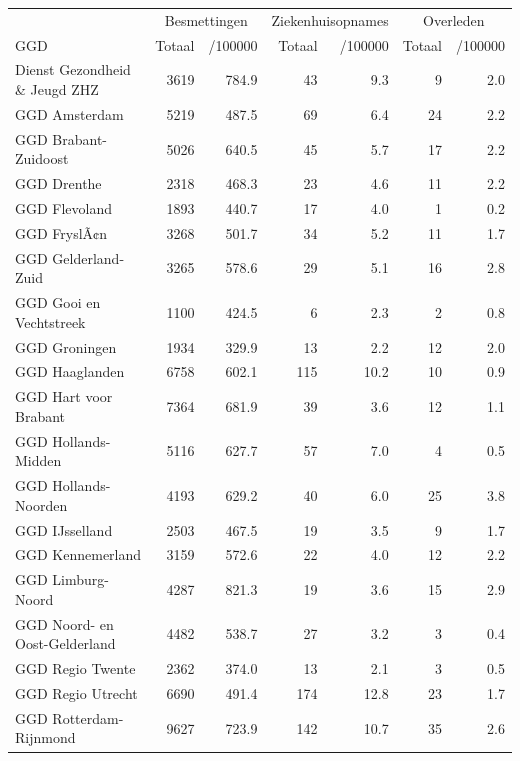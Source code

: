 \documentclass[
  english,
  man,floatsintext]{apa6}
\begin{document}
\begin{table}
\centering\begingroup\fontsize{10}{12}\selectfont

\begin{threeparttable}
\begin{tabular}{lrrrrrr}
\toprule
\multicolumn{1}{c}{ } & \multicolumn{2}{c}{Besmettingen} & \multicolumn{2}{c}{Ziekenhuisopnames} & \multicolumn{2}{c}{Overleden} \\
\cmidrule(l{3pt}r{3pt}){2-3} \cmidrule(l{3pt}r{3pt}){4-5} \cmidrule(l{3pt}r{3pt}){6-7}
GGD & Totaal & /100000 & Totaal & /100000 & Totaal & /100000\\
\midrule
Dienst Gezondheid \& Jeugd ZHZ & 3619 & 784.9 & 43 & 9.3 & 9 & 2.0\\
GGD Amsterdam & 5219 & 487.5 & 69 & 6.4 & 24 & 2.2\\
GGD Brabant-Zuidoost & 5026 & 640.5 & 45 & 5.7 & 17 & 2.2\\
GGD Drenthe & 2318 & 468.3 & 23 & 4.6 & 11 & 2.2\\
GGD Flevoland & 1893 & 440.7 & 17 & 4.0 & 1 & 0.2\\
GGD FryslÃ¢n & 3268 & 501.7 & 34 & 5.2 & 11 & 1.7\\
GGD Gelderland-Zuid & 3265 & 578.6 & 29 & 5.1 & 16 & 2.8\\
GGD Gooi en Vechtstreek & 1100 & 424.5 & 6 & 2.3 & 2 & 0.8\\
GGD Groningen & 1934 & 329.9 & 13 & 2.2 & 12 & 2.0\\
GGD Haaglanden & 6758 & 602.1 & 115 & 10.2 & 10 & 0.9\\
GGD Hart voor Brabant & 7364 & 681.9 & 39 & 3.6 & 12 & 1.1\\
GGD Hollands-Midden & 5116 & 627.7 & 57 & 7.0 & 4 & 0.5\\
GGD Hollands-Noorden & 4193 & 629.2 & 40 & 6.0 & 25 & 3.8\\
GGD IJsselland & 2503 & 467.5 & 19 & 3.5 & 9 & 1.7\\
GGD Kennemerland & 3159 & 572.6 & 22 & 4.0 & 12 & 2.2\\
GGD Limburg-Noord & 4287 & 821.3 & 19 & 3.6 & 15 & 2.9\\
GGD Noord- en Oost-Gelderland & 4482 & 538.7 & 27 & 3.2 & 3 & 0.4\\
GGD Regio Twente & 2362 & 374.0 & 13 & 2.1 & 3 & 0.5\\
GGD Regio Utrecht & 6690 & 491.4 & 174 & 12.8 & 23 & 1.7\\
GGD Rotterdam-Rijnmond & 9627 & 723.9 & 142 & 10.7 & 35 & 2.6\\

\end{tabular}
\end{threeparttable}
\end{table}
\end{document}
